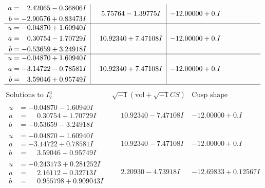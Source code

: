 \documentclass[1p]{elsarticle_modified}
\theoremstyle{definition}
\newcommand{\I}{\sqrt{-1}}
\begin{document}
$$\begin{array}{c|c|c}
\begin{aligned}
a &= \phantom{-}2.42065 - 0.36806 I \\
b &= -2.90576 + 0.83473 I\end{aligned}
 & \phantom{-}5.75764 - 1.39775 I & -12.00000 + 0. I\phantom{ +0.000000I} \\ \hline\begin{aligned}
u &= -0.04870 + 1.60940 I \\
a &= \phantom{-}0.30754 - 1.70729 I \\
b &= -0.53659 + 3.24918 I\end{aligned}
 & \phantom{-}10.92340 + 7.47108 I & -12.00000 + 0. I\phantom{ +0.000000I} \\ \hline\begin{aligned}
u &= -0.04870 + 1.60940 I \\
a &= -3.14722 - 0.78581 I \\
b &= \phantom{-}3.59046 + 0.95749 I\end{aligned}
 & \phantom{-}10.92340 + 7.47108 I & -12.00000 + 0. I\phantom{ +0.000000I}\\
 \hline 
 \end{array}$$\newpage$$\begin{array}{c|c|c}  
\text{Solutions to }I^u_{2}& \I (\text{vol} + \sqrt{-1}CS) & \text{Cusp shape}\\
 \hline 
\begin{aligned}
u &= -0.04870 - 1.60940 I \\
a &= \phantom{-}0.30754 + 1.70729 I \\
b &= -0.53659 - 3.24918 I\end{aligned}
 & \phantom{-}10.92340 - 7.47108 I & -12.00000 + 0. I\phantom{ +0.000000I} \\ \hline\begin{aligned}
u &= -0.04870 - 1.60940 I \\
a &= -3.14722 + 0.78581 I \\
b &= \phantom{-}3.59046 - 0.95749 I\end{aligned}
 & \phantom{-}10.92340 - 7.47108 I & -12.00000 + 0. I\phantom{ +0.000000I} \\ \hline\begin{aligned}
u &= -0.243173 + 0.281252 I \\
a &= \phantom{-}2.16112 - 0.32713 I \\
b &= \phantom{-}0.955798 + 0.909043 I\end{aligned}
 & \phantom{-}2.20930 - 4.73918 I & -12.69833 + 0.12567 I \\ \hline\begin{aligned}

\end{aligned}
\end{array}$$
\end{document}
